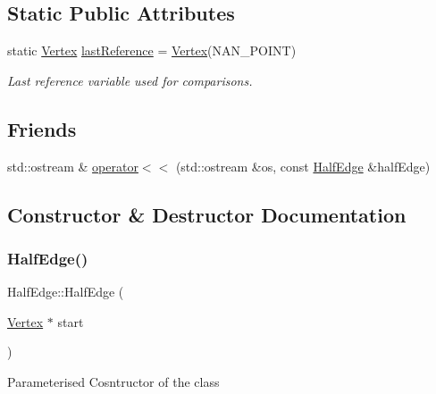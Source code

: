\subsection*{Static Public Attributes}
\begin{DoxyCompactItemize}
\item 
\mbox{\label{classHalfEdge_aec4bcf8689ab12d9a6a1e41beec74ad9}} 
static \hyperlink{classVertex}{Vertex} \hyperlink{classHalfEdge_aec4bcf8689ab12d9a6a1e41beec74ad9}{last\+Reference} = \hyperlink{classVertex}{Vertex}(N\+A\+N\+\_\+\+P\+O\+I\+NT)
\begin{DoxyCompactList}\small\item\em Last reference variable used for comparisons. \end{DoxyCompactList}\end{DoxyCompactItemize}
\subsection*{Friends}
\begin{DoxyCompactItemize}
\item 
std\+::ostream \& \hyperlink{classHalfEdge_aa0f4a0b4e7cf4c13857514f195007014}{operator$<$$<$} (std\+::ostream \&os, const \hyperlink{classHalfEdge}{Half\+Edge} \&half\+Edge)
\end{DoxyCompactItemize}


\subsection{Constructor \& Destructor Documentation}
\mbox{\label{classHalfEdge_af73e9a2bacfdc231be1fa45f8d1dc485}} 
\subsubsection{\texorpdfstring{Half\+Edge()}{HalfEdge()}\hspace{0.1cm}{\footnotesize\ttfamily [1/2]}}
{\footnotesize\ttfamily Half\+Edge\+::\+Half\+Edge (\begin{DoxyParamCaption}\item[{\hyperlink{classVertex}{Vertex} $\ast$}]{start }\end{DoxyParamCaption})}

Parameterised Cosntructor of the class \mbox{\label{classHalfEdge_a9694f1dbddb8e3017ab75f5156d11da3}} 
